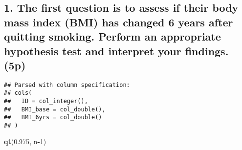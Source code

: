\documentclass[]{article}
\newenvironment{Shaded}{\begin{snugshade}}{\end{snugshade}}
\newcommand{\KeywordTok}[1]{\textcolor[rgb]{0.13,0.29,0.53}{\textbf{#1}}}
\newcommand{\DataTypeTok}[1]{\textcolor[rgb]{0.13,0.29,0.53}{#1}}
\newcommand{\DecValTok}[1]{\textcolor[rgb]{0.00,0.00,0.81}{#1}}
\newcommand{\FloatTok}[1]{\textcolor[rgb]{0.00,0.00,0.81}{#1}}
\newcommand{\StringTok}[1]{\textcolor[rgb]{0.31,0.60,0.02}{#1}}
\newcommand{\OperatorTok}[1]{\textcolor[rgb]{0.81,0.36,0.00}{\textbf{#1}}}
\newcommand{\NormalTok}[1]{#1}
\begin{document}
\subsection{1. The first question is to assess if their body mass index
(BMI) has changed 6 years after quitting smoking. Perform an appropriate
hypothesis test and interpret your findings.
(5p)}\label{the-first-question-is-to-assess-if-their-body-mass-index-bmi-has-changed-6-years-after-quitting-smoking.-perform-an-appropriate-hypothesis-test-and-interpret-your-findings.-5p}

\begin{Shaded}
\end{Shaded}

\begin{verbatim}
## Parsed with column specification:
## cols(
##   ID = col_integer(),
##   BMI_base = col_double(),
##   BMI_6yrs = col_double()
## )
\end{verbatim}

\begin{Shaded}
\end{Shaded}

\begin{Shaded}
\begin{Highlighting}[]
\KeywordTok{qt}\NormalTok{(}\FloatTok{0.975}\NormalTok{, n}\OperatorTok{-}\DecValTok{1}\NormalTok{)}
\end{Highlighting}
\end{Shaded}
\end{document}
